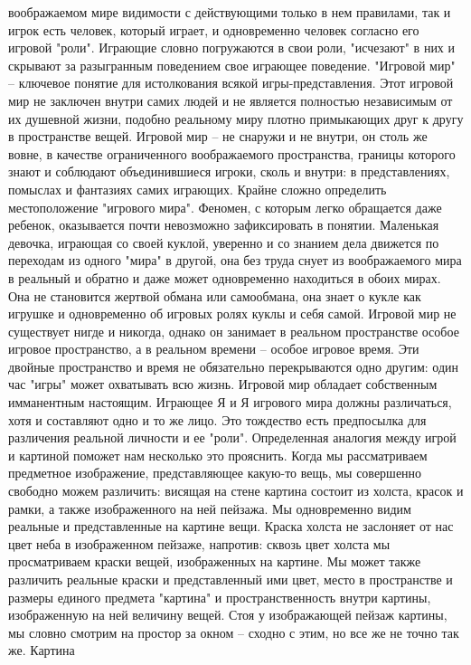 \documentclass[12pt]{article}
\begin{document}
воображаемом мире видимости с действующими только в нем правилами, так и игрок есть человек, который
играет, и одновременно человек согласно его игровой "роли". Играющие словно погружаются в свои роли,
"исчезают" в них и скрывают за разыгранным поведением свое играющее поведение.
"Игровой мир" -- ключевое понятие для истолкования всякой
игры-представления. Этот игровой мир не заключен внутри самих людей и не является полностью независимым
от их душевной жизни, подобно реальному миру плотно примыкающих друг к другу в пространстве вещей.
Игровой  мир  --  не  снаружи  и  не  внутри,  он  столь  же  вовне,  в  качестве  ограниченного  воображаемого
пространства, границы которого знают и соблюдают объединившиеся игроки, сколь и внутри: в представлениях,
помыслах  и  фантазиях  самих  играющих.  Крайне  сложно  определить  местоположение  "игрового  мира".
Феномен, с которым легко обращается даже ребенок, оказывается почти невозможно зафиксировать в понятии.
Маленькая девочка, играющая со своей куклой, уверенно и со знанием дела
движется по переходам из одного "мира" в другой, она без труда снует из воображаемого мира в реальный и
обратно  и  даже  может  одновременно  находиться  в  обоих  мирах.  Она  не  становится  жертвой  обмана  или
самообмана, она знает о кукле как игрушке и одновременно об игровых ролях куклы и себя самой. Игровой мир
не существует нигде и никогда, однако он занимает в реальном пространстве особое игровое пространство, а в
реальном времени -- особое игровое время. Эти двойные пространство и время не обязательно перекрываются
одно другим: один час "игры" может охватывать всю жизнь. Игровой мир обладает собственным имманентным
настоящим. Играющее Я и Я игрового мира должны различаться, хотя и составляют одно и то же лицо. Это
тождество есть предпосылка для различения реальной личности и ее "роли". Определенная аналогия между
игрой и картиной поможет нам несколько это прояснить. Когда мы рассматриваем предметное изображение,
представляющее какую-то вещь, мы совершенно свободно можем различить: висящая на стене картина состоит
из  холста,  красок и рамки,  а также изображенного  на ней пейзажа.  Мы одновременно  видим реальные  и
представленные на картине  вещи. Краска холста  не  заслоняет от  нас цвет неба  в  изображенном пейзаже,
напротив: сквозь цвет холста мы просматриваем краски вещей, изображенных на картине. Мы может также
различить реальные краски и представленный ими цвет, место в пространстве и размеры единого предмета 
"картина" и пространственность внутри картины, изображенную на ней величину вещей. Стоя у изображающей
пейзаж картины, мы словно смотрим на простор за окном -- сходно с этим, но все же не точно так же. Картина
\end{document}
